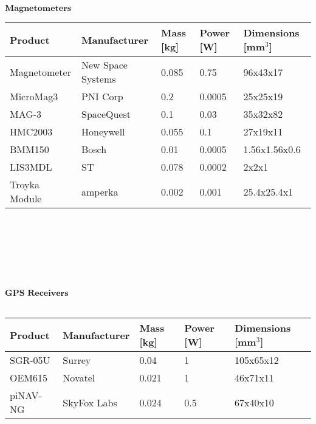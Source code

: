        
      
  $\textbf{Magnetometers}$\\
     
      
      
      \begin{tabular}{p{3cm}p{3cm}p{2cm}p{2cm}p{2cm}} \toprule
      	Product & Manufacturer & Mass [kg] & Power [W]& Dimensions [mm$^{3}$]\\ \midrule
      	
      			Magnetometer & New Space Systems & 0.085 & 0.75 & 96x43x17 \\
      	
      			MicroMag3 & PNI Corp  & 0.2 & 0.0005 & 25x25x19 \\
      			
      			MAG-3 & SpaceQuest  & 0.1 & 0.03 & 35x32x82  \\
      		
      			HMC2003 & Honeywell & 0.055 & 0.1 & 27x19x11 \\
      			
      			BMM150 & Bosch & 0.01 & 0.0005 & 1.56x1.56x0.6 \\
      		
      			LIS3MDL & ST & 0.078 & 0.0002 & 2x2x1 \\
      			
      			Troyka Module & amperka & 0.002 & 0.001 & 25.4x25.4x1  \\ \bottomrule
      \end{tabular}\\ \\ \\ \\ \\ \\ 
      
       $\textbf{GPS Receivers}$\\ \\
	      \begin{tabular}{p{3cm}p{3cm}p{2cm}p{2cm}p{2cm}} \toprule
       	Product & Manufacturer & Mass [kg] & Power [W]& Dimensions [mm$^{3}$]\\ \midrule
       	
		       SGR-05U & Surrey & 0.04 & 1 & 105x65x12 \\
		       
		       OEM615 & Novatel & 0.021 & 1 & 46x71x11 \\
		       
		       piNAV-NG  & SkyFox Labs & 0.024 & 0.5 & 67x40x10 \\ \bottomrule
       \end{tabular}\\ \\ \\ \\
 
